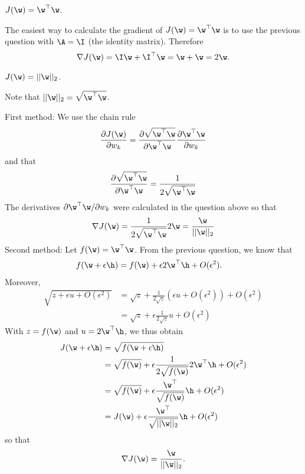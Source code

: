 \begin{exenumerate}
\item $J(\w)=\w^\top \w$.

  \begin{solution}
    The easiest way to calculate the gradient of $J(\w) = \w^\top\w$ is to use the previous question with $\A = \I$ (the identity matrix).
    Therefore
    \begin{equation}
      \nabla J(\w) = \I\w + \I^\top\w = \w + \w = 2\w.
    \end{equation}

  \end{solution}

\item $J(\w)=||\w||_2$.

  \begin{solution}
    Note that $||\w||_2 = \sqrt{\w^\top \w}$.

    First method: We use the chain rule
    \begin{equation}
      \frac{\partial{J(\w)}}{\partial{w_k}} = \frac{\partial \sqrt{\w^\top \w}}{\partial \w^\top \w}\frac{\partial \w^\top \w}{\partial w_k}
    \end{equation}
    and that
    \begin{equation}
      \frac{\partial \sqrt{\w^\top \w}}{\partial \w^\top \w} = \frac{1}{2\sqrt{\w^\top \w}}
    \end{equation}
    The derivatives $\partial \w^\top \w/\partial w_k$ were calculated in the question above so that
    \begin{equation}
      \nabla J(\w) = \frac{1}{2\sqrt{\w^\top \w}} 2 \w = \frac{\w}{||\w||_2}
    \end{equation}
    Second method: Let $f(\w) = \w^\top \w$. From the previous question, we know that
    \begin{align}
      f(\w + \epsilon \h) & = f(\w) + \epsilon 2\w^\top \h + O(\epsilon^2).
    \end{align}
    Moreover,
    \begin{align}
      \sqrt{z + \epsilon u + O(\epsilon^2)} & = \sqrt{z} + \frac{1}{2\sqrt{z}}(\epsilon u + O(\epsilon^2)) + O(\epsilon^2)\\
                                            & = \sqrt{z} + \epsilon \frac{1}{2\sqrt{z}} u + O(\epsilon^2)
    \end{align}
    With $z=f(\w)$ and $u = 2 \w^\top \h$, we thus obtain
    \begin{align}
      J(\w + \epsilon \h) &= \sqrt{f(\w+\epsilon \h)} \\
                          &= \sqrt{f(\w)} + \epsilon \frac{1}{2\sqrt{f(\w)}} 2\w^\top \h + O(\epsilon^2)\\
                          &= \sqrt{f(\w)} + \epsilon \frac{\w^\top}{\sqrt{f(\w)}}\h + O(\epsilon^2)\\
                          &= J(\w) +  \epsilon \frac{\w^\top}{\sqrt{||\w||_2}}\h + O(\epsilon^2)
    \end{align}
    so that
    \begin{equation}
      \nabla J(\w) = \frac{\w}{||\w||_2}.
    \end{equation}


\end{solution}
\end{exenumerate}
